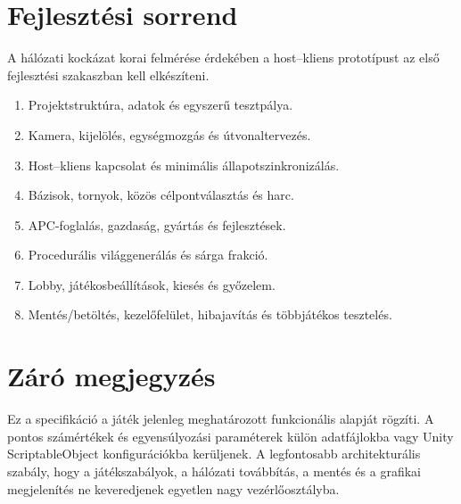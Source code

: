 \documentclass[12pt,a4paper]{article}
\begin{document}
\section{Fejlesztési sorrend}

A hálózati kockázat korai felmérése érdekében a host--kliens prototípust az első fejlesztési szakaszban kell elkészíteni.

\begin{enumerate}
  \item Projektstruktúra, adatok és egyszerű tesztpálya.
  \item Kamera, kijelölés, egységmozgás és útvonaltervezés.
  \item Host--kliens kapcsolat és minimális állapotszinkronizálás.
  \item Bázisok, tornyok, közös célpontválasztás és harc.
  \item APC-foglalás, gazdaság, gyártás és fejlesztések.
  \item Procedurális világgenerálás és sárga frakció.
  \item Lobby, játékosbeállítások, kiesés és győzelem.
  \item Mentés/betöltés, kezelőfelület, hibajavítás és többjátékos tesztelés.
\end{enumerate}

\section{Záró megjegyzés}

Ez a specifikáció a játék jelenleg meghatározott funkcionális alapját rögzíti. A pontos számértékek és egyensúlyozási paraméterek külön adatfájlokba vagy Unity ScriptableObject konfigurációkba kerüljenek. A legfontosabb architekturális szabály, hogy a játékszabályok, a hálózati továbbítás, a mentés és a grafikai megjelenítés ne keveredjenek egyetlen nagy vezérlőosztályba.
\end{document}
